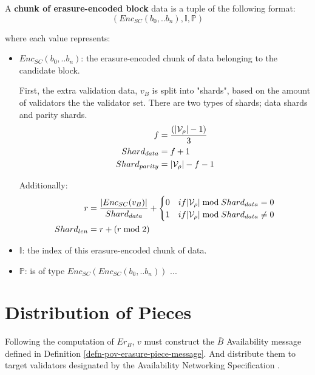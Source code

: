 \begin{definition}
  \label{defn-erasure-chunk}
  A \textbf{chunk of erasure-encoded block} data is a tuple of the following format:
  \[
    (Enc_{SC}(b_0, .. b_n), \mathbb{I}, \mathbb{P})
  \]

  where each value represents:
  \begin{itemize}
    \item $Enc_{SC}(b_0, .. b_n)$: the erasure-encoded chunk of data belonging
    to the candidate block.

    First, the extra validation data, $v_B$ is split into "shards", based on the
    amount of validators the the validator set. There are two types of shards;
    data shards and parity shards.
    \begin{alignat*}{2}
      f &= \frac{(|\mathcal{V}_\rho| - 1)}{3} \\
      Shard_{data} &= f + 1 \\
      Shard_{parity} &= |\mathcal{V}_\rho| - f - 1
    \end{alignat*}

    Additionally:
    \begin{alignat*}{2}
      r &= \frac{|Enc_{SC}(v_B)|}{Shard_{data}} +
      \begin{cases}
        0 & if |\mathcal{V}_\rho| \bmod{Shard_{data}} = 0 \\
        1 & if |\mathcal{V}_\rho| \bmod{Shard_{data}} \neq 0 \\
      \end{cases} \\
      Shard_{len} &= r + (r \bmod{2})
    \end{alignat*}

    \item $\mathbb{I}$: the index of this erasure-encoded chunk of data.
    \item $\mathbb{P}$: is of type $Enc_{SC}(Enc_{SC}(b_0, .. b_n))$ ...
  \end{itemize}
\end{definition}

\section{Distribution of Pieces}\label{sect-distribute-pieces} Following the
computation of $Er_B$, $v$ must construct the $\bar{B}$ Availability message
defined in Definition \ref{defn-pov-erasure-piece-message}. And distribute them
to target validators designated by the Availability Networking Specification
\cite{??}.

